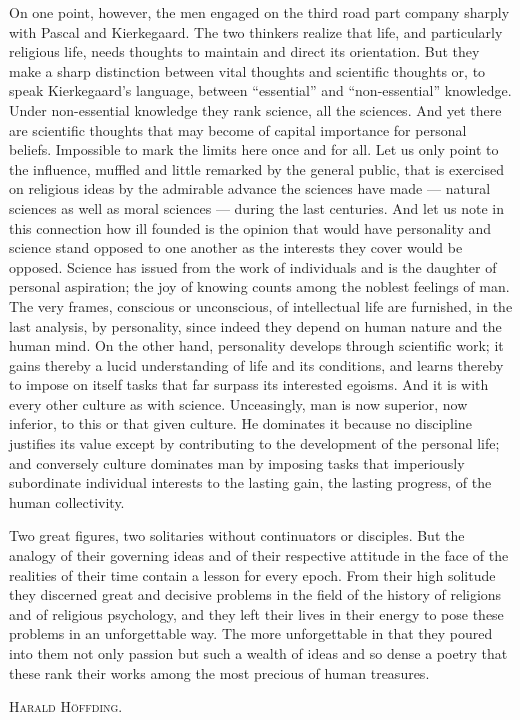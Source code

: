 \documentclass[12pt,a4paper]{article}
\newcommand{\opage}[1]{\marginnote{\footnotesize\textit{[#1]}}}
\begin{document}
On one point, however, the men engaged on the third road part company sharply
with Pascal and Kierkegaard. The two thinkers realize that life, and
particularly religious life, needs thoughts to maintain and direct its
orientation. But they make a sharp distinction between vital thoughts and
scientific thoughts or, to speak Kierkegaard's language, between ``essential''
and ``non-essential'' knowledge. Under non-essential knowledge they rank science,
all the sciences. And yet there are scientific thoughts that may become of
capital importance for personal beliefs. Impossible to mark the limits here once
and for all. Let us only point to the influence, muffled and little remarked by
the general public, that is exercised on religious ideas by the admirable
advance the sciences have made --- natural sciences as well as moral sciences
--- during the last centuries. And let us note in this connection how ill founded
is the opinion that would have personality and science stand opposed to one
another as the interests they cover would be opposed. Science has issued from the
work of individuals and is the daughter of personal aspiration; the joy of
knowing counts among the noblest feelings of man. The very frames, conscious or
unconscious, of intellectual life are furnished, in the last analysis, by
personality, since indeed they depend on human nature and the human mind. On the
other hand, personality develops through scientific work; it
\opage{246}gains thereby a lucid understanding of life and its conditions, and learns
thereby to impose on itself tasks that far surpass its interested egoisms. And
it is with every other culture as with science. Unceasingly, man is now superior,
now inferior, to this or that given culture. He dominates it because no
discipline justifies its value except by contributing to the development of the
personal life; and conversely culture dominates man by imposing tasks that
imperiously subordinate individual interests to the lasting gain, the lasting
progress, of the human collectivity.

\bigskip

Two great figures, two solitaries without continuators or disciples. But the
analogy of their governing ideas and of their respective attitude in the face of
the realities of their time contain a lesson for every epoch.
From their high solitude they discerned great and decisive problems in the field
of the history of religions and of religious psychology, and they left their
lives in their energy to pose these problems in an unforgettable way. The more
unforgettable in that they poured into them not only passion but such a wealth
of ideas and so dense a poetry that these rank their works among the most
precious of human treasures.

\bigskip

\hfill \textsc{Harald Höffding.}
\end{document}
